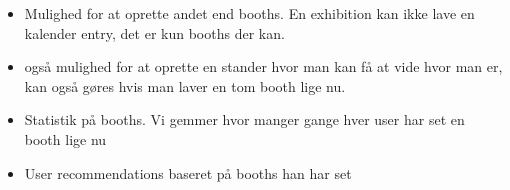 \begin{itemize}
\item Mulighed for at oprette andet end booths. En exhibition kan ikke lave en kalender entry, det er kun booths der kan.
\item også mulighed for at oprette en stander hvor man kan få at vide hvor man er, kan også gøres hvis man laver en tom booth lige nu.
\item Statistik på booths. Vi gemmer hvor manger gange hver user har set en booth lige nu
\item User recommendations baseret på booths han har set
\end{itemize}